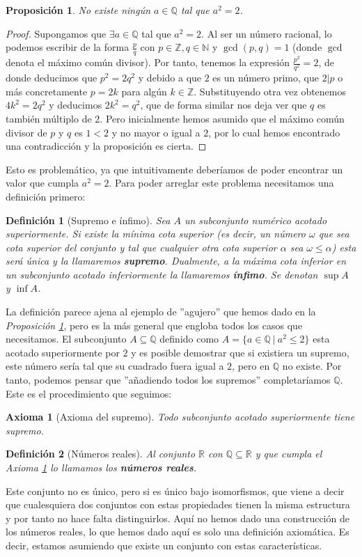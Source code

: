 \documentclass{article}
\newtheorem{prop}{Proposición}
\newtheorem{axiom}{Axioma}
\newtheorem{define}{Definición}
\begin{document}
\begin{prop}\label{prop_2_irrational}
No existe ningún $a \in \mathbb{Q}$ tal que $a^{2} = 2$.
\end{prop}
\begin{proof}
	Supongamos que $\exists a \in \mathbb{Q}$ tal que $a^2 = 2$. Al ser un número racional, lo podemos escribir de la forma $\frac{p}{q}$ con $p\in \mathbb{Z},q\in \mathbb{N}$ y $\gcd(p,q) = 1$ (donde $\gcd$ denota el máximo común divisor). Por tanto, tenemos la expresión $\frac{p^2}{q^2} = 2$, de donde deducimos que $p^2 = 2q^2$ y debido a que $2$ es un número primo, que $2|p$ o más concretamente $p=2k$ para algún $k \in \mathbb{Z}$. Substituyendo otra vez obtenemos $4k^2 = 2q^2$ y deducimos $2k^2 = q^2$, que de forma similar nos deja ver que $q$ es también múltiplo de 2. Pero inicialmente hemos asumido que el máximo común divisor de $p$ y $q$ es $1<2$ y no mayor o igual a $2$, por lo cual hemos encontrado una contradicción y la proposición es cierta.
\end{proof}
Esto es problemático, ya que intuitivamente deberíamos de poder encontrar un valor que cumpla $a^2 = 2$. Para poder arreglar este problema necesitamos una definición primero:

\begin{define}[Supremo e ínfimo]
	Sea $A$ un subconjunto numérico acotado superiormente. Si existe la mínima cota superior (es decir, un número $\omega$ que sea cota superior del conjunto y tal que cualquier otra cota superior $\alpha$ sea $\omega \leq \alpha$) esta será única y la llamaremos \textbf{supremo}. Dualmente, a la máxima cota inferior en un subconjunto acotado inferiormente la llamaremos \textbf{ínfimo}. Se denotan $\sup A$ y $\inf A$.
\end{define}
La definición parece ajena al ejemplo de ''agujero'' que hemos dado en la \textit{Proposición \ref{prop_2_irrational}}, pero es la más general que engloba todos los casos que necesitamos. El subconjunto $A\subseteq \mathbb{Q}$ definido como $A = \{a\in \mathbb{Q}\ |\ a^2 \leq 2\}$ esta acotado superiormente por $2$ y es posible demostrar que si existiera un supremo, este número sería tal que su cuadrado fuera igual a $2$, pero en $\mathbb{Q}$ no existe. Por tanto, podemos pensar que ''añadiendo todos los supremos'' completaríamos $\mathbb{Q}$. Este es el procedimiento que seguimos:
\begin{axiom}[Axioma del supremo] \label{ax_supr}
	Todo subconjunto acotado superiormente tiene supremo.
\end{axiom}
\begin{define}[Números reales]
	Al conjunto $\mathbb{R}$ con $\mathbb{Q} \subseteq \mathbb{R}$ y que cumpla el \textit{Axioma \ref{ax_supr}} lo llamamos los \textbf{números reales}.
\end{define}
Este conjunto no es único, pero si es único bajo isomorfismos, que viene a decir que cualesquiera dos conjuntos con estas propiedades tienen la misma estructura y por tanto no hace falta distinguirlos. Aquí no hemos dado una construcción de los números reales, lo que hemos dado aquí es solo una definición axiomática. Es decir, estamos asumiendo que existe un conjunto con estas características.
\end{document}
